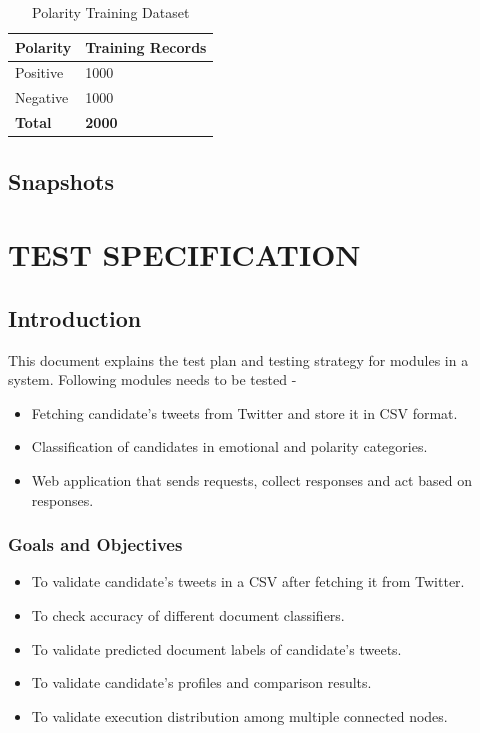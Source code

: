 \documentclass[oneside,a4paper,12pt]{pictreport}
\begin{document}
\renewcommand{\arraystretch}{1.5}

\begin{table}[h!]
\centering
\caption{Polarity Training Dataset}
\label{my-label}
\begin{tabular}{|l|l|}
\hline
\textbf{Polarity} & \textbf{Training Records} \\ \hline
Positive          & 1000                      \\ \hline
Negative          & 1000                      \\ \hline

\textbf{Total}    & \textbf{2000}             \\ \hline
\end{tabular}
\end{table}


\section{Snapshots}

\chapter{TEST SPECIFICATION}

\section{Introduction}
This document explains the test plan and testing strategy for modules in a system. Following modules needs to be tested - 
\begin{itemize}
\item Fetching candidate's tweets from Twitter and store it in CSV format.
\item Classification of candidates in emotional and polarity categories.
\item Web application that sends requests, collect responses and act based on responses.
\end{itemize}

\subsection{Goals and Objectives}
\begin{itemize}
\item To validate candidate's tweets in a CSV after fetching it from Twitter.
\item To check accuracy of different document classifiers.
\item To validate predicted document labels of candidate's tweets.
\item To validate candidate's profiles and comparison results.
\item To validate execution distribution among multiple connected nodes.
\end{itemize}
\end{document}

